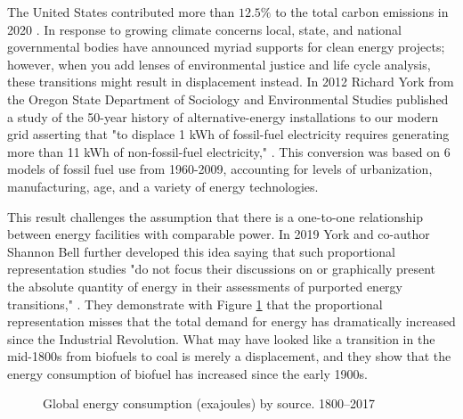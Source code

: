 The United States contributed more than $12.5\%$ to the total carbon emissions
in 2020 \cite{european_commission_joint_research_centre_ghg_2021}. In response
to growing climate concerns local, state, and national governmental bodies have
announced myriad supports for clean energy projects; however, when you add
lenses of environmental justice and life cycle analysis, these transitions might
result in displacement instead. In 2012 Richard York from the Oregon State
Department of Sociology and Environmental Studies published a study of the
50-year history of alternative-energy installations to our modern grid
asserting that "to displace 1 kWh of fossil-fuel electricity requires
generating more than 11 kWh of non-fossil-fuel electricity,"
\cite{york_alternative_2012}. This conversion was based on 6 models of fossil
fuel use from 1960-2009, accounting for levels of urbanization, manufacturing,
age, and a variety of energy technologies.

This result challenges the assumption that there is a one-to-one relationship
between energy facilities with comparable power. In 2019 York and co-author
Shannon Bell further developed this idea saying that such proportional
representation studies "do not focus their discussions on or graphically
present the absolute quantity of energy in their assessments of purported
energy transitions," \cite{york_energy_2019}. They demonstrate with Figure
\ref{fig:percent_total_energy} that the proportional representation misses that
the total demand for energy has dramatically increased since the Industrial
Revolution. What may have looked like a transition in the mid-1800s from
biofuels to coal is merely a displacement, and they show that the energy
consumption of biofuel has increased since the early 1900s.

\begin{figure}[H]
  \hfill
  \caption{
    Global energy consumption (exajoules) by source. 1800--2017
    \cite{york_energy_2019}}
  \label{fig:percent_total_energy}
\end{figure}

